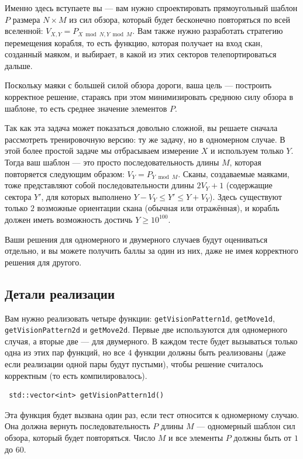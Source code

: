 \documentclass[12pt]{article}
\begin{document}
Именно здесь вступаете вы --- вам нужно спроектировать прямоугольный шаблон $P$ размера $N \times M$ из сил обзора, который будет бесконечно повторяться по всей вселенной: $V_{X, Y} = P_{X \bmod N, Y \bmod M}$. Вам также нужно разработать стратегию перемещения корабля, то есть функцию, которая получает на вход скан, созданный маяком, и выбирает, в какой из этих секторов телепортироваться дальше.

Поскольку маяки с большей силой обзора дороги, ваша цель --- построить корректное решение, стараясь при этом минимизировать среднюю силу обзора в шаблоне, то есть среднее значение элементов $P$.

Так как эта задача может показаться довольно сложной, вы решаете сначала рассмотреть тренировочную версию: ту же задачу, но в одномерном случае. В этой более простой задаче мы отбрасываем измерение $X$ и используем только $Y$. Тогда ваш шаблон --- это просто последовательность длины $M$, которая повторяется следующим образом: $V_Y = P_{Y \bmod M}$. Сканы, создаваемые маяками, тоже представляют собой последовательности длины $2V_Y + 1$ (содержащие сектора $Y'$, для которых выполнено $Y - V_Y \leq Y' \leq Y + V_Y$). Здесь существуют только $2$ возможные ориентации скана (обычная или отражённая), и корабль должен иметь возможность достичь $Y \geq 10^{100}$.

Ваши решения для одномерного и двумерного случаев будут оцениваться отдельно, и вы можете получить баллы за один из них, даже не имея корректного решения для другого.

\subsection{Детали реализации}

Вам нужно реализовать четыре функции: \verb|getVisionPattern1d|, \verb|getMove1d|, \verb|getVisionPattern2d| и \verb|getMove2d|. Первые две используются для одномерного случая, а вторые две --- для двумерного. В каждом тесте будет вызываться только одна из этих пар функций, но все $4$ функции должны быть реализованы (даже если реализации одной пары будут пустыми), чтобы решение считалось корректным (то есть компилировалось).

\begin{lstlisting}
 std::vector<int> getVisionPattern1d()
\end{lstlisting}

Эта функция будет вызвана один раз, если тест относится к одномерному случаю. Она должна вернуть последовательность $P$ длины $M$ --- одномерный шаблон сил обзора, который будет повторяться. Число $M$ и все элементы $P$ должны быть от $1$ до $60$.
\end{document}
